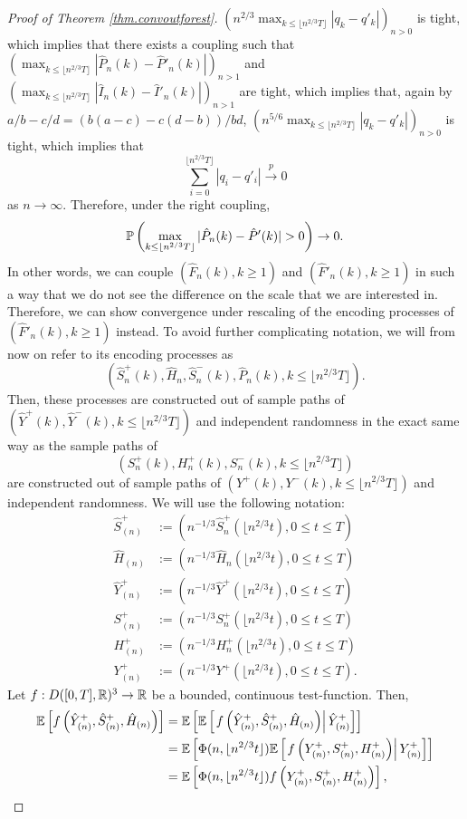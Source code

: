 \begin{proof}[Proof of Theorem \ref{thm.convoutforest}]
$\left(n^{2/3}\max_{k\leq \lfloor n^{2/3}T\rfloor }|q_k-q'_k|\right)_{n>0}$ is tight, which implies that there exists a coupling such that $\left(\max_{k\leq \lfloor n^{2/3}T\rfloor } |\hat{P}_n(k)-\hat{P}'_n(k)|\right)_{n>1}$ and $\left(\max_{k\leq \lfloor n^{2/3}T\rfloor } |\hat{I}_n(k)-\hat{I}'_n(k)|\right)_{n>1}$ are tight, which implies that, again by $a/b-c/d=(b(a-c)-c(d-b))/bd$, 
$\left(n^{5/6}\max_{k\leq \lfloor n^{2/3}T\rfloor }|q_k-q'_k|\right)_{n>0}$ is tight, which implies that 
$$\sum_{i=0}^{\lfloor n^{2/3}T\rfloor }|q_i-q'_i|\overset{p}{\to}0$$
as $n\to \infty$. 
Therefore, under the right coupling, 
$$\P\left(\max_{k\leq \lfloor n^{2/3} T \rfloor}|\hat{P}_n(k)-\hat{P}'(k)|>0\right)\to 0.$$
In other words, we can couple $(\hat{F}_n(k),k\geq 1)$ and $(\hat{F}'_n(k),k\geq 1)$ in such a way that we do not see the difference on the scale that we are interested in. Therefore, we can show convergence under rescaling of the encoding processes of $(\hat{F}'_n(k),k\geq 1)$ instead. To avoid further complicating notation, we will from now on refer to its encoding processes as $$(\hat{S}^{+}_n(k),\hat{H}_n, \hat{S}^-_n(k), \hat{P}_n(k),k\leq \lfloor n^{2/3}T\rfloor).$$ Then, these processes are constructed out of sample paths of $(\hat{Y}^+(k),\hat{Y}^-(k), k\leq \lfloor n^{2/3}T\rfloor )$ and independent randomness in the exact same way as the sample paths of $$({S}_n^{+}(k),{H}_n^+(k),{S}_n^-(k), k \leq \lfloor n^{2/3}T\rfloor )$$ are constructed out of sample paths of $(Y^+(k),Y^-(k), k\leq \lfloor n^{2/3}T\rfloor )$ and independent randomness. 
We will use the following notation:\begin{align*}
    \hat{S}^{+}_{(n)}&:=\left(n^{-1/3}\hat{S}^{+}_n\left(\lfloor n^{2/3} t \right),0\leq t \leq T\right)\\
    \hat{H}_{(n)}&:=\left(n^{-1/3}\hat{H}_n\left(\lfloor n^{2/3} t \right),0\leq t \leq T\right)\\
    \hat{Y}^+_{(n)}&:=\left(n^{-1/3}\hat{Y}^+\left(\lfloor n^{2/3} t \right),0\leq t \leq T\right)\\
     {S}^{+}_{(n)}&:=\left(n^{-1/3}{S}^{+}_n\left(\lfloor n^{2/3} t \right),0\leq t \leq T\right)\\
    {H}^+_{(n)}&:=\left(n^{-1/3}{H}^+_n\left(\lfloor n^{2/3} t \right),0\leq t \leq T\right)\\
    {Y}^+_{(n)}&:=\left(n^{-1/3}{Y}^+\left(\lfloor n^{2/3} t \right),0\leq t \leq T\right).
\end{align*}
Let $f:D([0,T],{\mathbb R})^3\to {\mathbb R}$ be a bounded, continuous test-function. Then,
\begin{align*}{\mathbb E}\left[f\left(\hat{Y}^+_{(n)}, \hat{S}^+_{(n)},  \hat{H}_{(n)}\right) \right]&= {\mathbb E}\left[ {\mathbb E}\left[\left. f\left(\hat{Y}^+_{(n)},\hat{S}^+_{(n)},  \hat{H}_{(n)}\right)\right|\hat{Y}^+_{(n)}\right]\right]\\&={\mathbb E}\left[ \Phi(n,\lfloor n^{2/3} t\rfloor){\mathbb E}\left[\left.f\left(Y^+_{(n)}, S^+_{(n)},  H^+_{(n)}\right)\right| {Y}^+_{(n)}\right]\right]\\&={\mathbb E}\left[ \Phi(n,\lfloor n^{2/3} t\rfloor)f\left(Y^+_{(n)},S^+_{(n)},  H^+_{(n)}\right)\right],\end{align*}

\end{proof}
